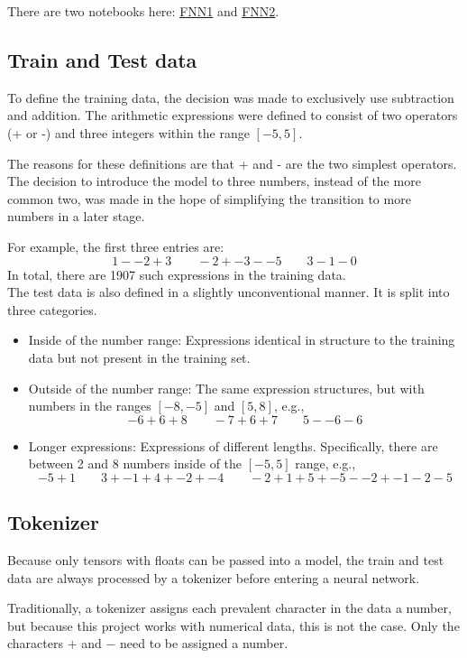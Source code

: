 \documentclass{article}
\begin{document}
There are two notebooks here: \href{https://github.com/AntonStantan/matura/blob/main/FNN/FNN1.ipynb}{FNN1} and \href{https://github.com/AntonStantan/matura/blob/main/FNN/FNN2.ipynb}{FNN2}.

\subsection{Train and Test data}
To define the training data, the decision was made to exclusively use subtraction and addition. The arithmetic expressions were defined to consist of two operators (+ or -) and three integers within the range $[-5, 5]$.

The reasons for these definitions are that + and - are the two simplest operators. The decision to introduce the model to three numbers, instead of the more common two, was made in the hope of simplifying the transition to more numbers in a later stage.

For example, the first three entries are:
\[
1 - -2 + 3 \qquad -2 + -3 - -5 \qquad 3 - 1 - 0
\]
{\small In total, there are 1907 such expressions in the training data.}
\\[2em]
The test data is also defined in a slightly unconventional manner. It is split into three categories.
\begin{itemize}
    \item Inside of the number range: Expressions identical in structure to the training data but not present in the training set.
    \item Outside of the number range: The same expression structures, but with numbers in the ranges $[-8, -5]$ and $[5, 8]$, e.g.,
\[
-6 + 6 + 8 \qquad -7 + 6 + 7 \qquad 5 - -6 - 6
\]
    \item Longer expressions: Expressions of different lengths. Specifically, there are between 2 and 8 numbers inside of the $[-5, 5]$ range, e.g.,
\[
-5 + 1 \qquad 3 + -1 + 4 + -2 + -4 \qquad -2 + 1 + 5 + -5 - -2 + -1 - 2 - 5
\]
\end{itemize}

\subsection{Tokenizer}

Because only tensors with floats can be passed into a model, the train and test data are always processed by a tokenizer before entering a neural network.

Traditionally, a tokenizer assigns each prevalent character in the data a number, but because this project works with numerical data, this is not the case. Only the characters $+$ and $-$ need to be assigned a number.
\end{document}
